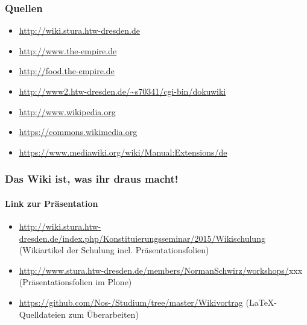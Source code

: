 \documentclass{beamer}              %
\begin{document}
\begin{frame}
  \frametitle{Quellen}
  \begin{itemize}
    \item \url{http://wiki.stura.htw-dresden.de}
    \item \url{http://www.the-empire.de}
    \item \url{http://food.the-empire.de}
    \item \url{http://www2.htw-dresden.de/~s70341/cgi-bin/dokuwiki}
    \item \url{http://www.wikipedia.org}
    \item \url{https://commons.wikimedia.org}
    \item \url{https://www.mediawiki.org/wiki/Manual:Extensions/de}
  \end{itemize}  
\end{frame}

% 
% 
\begin{frame}
  \frametitle{Das Wiki ist, was ihr draus macht!}
  \framesubtitle{Link zur Präsentation}
  \begin{itemize}
    \item \url{http://wiki.stura.htw-dresden.de/index.php/Konstituierungsseminar/2015/Wikischulung} (Wikiartikel der Schulung incl. Präsentationsfolien)
    \item \url{http://www.stura.htw-dresden.de/members/NormanSchwirz/workshops/}xxx (Präsentationsfolien im Plone)
    \item \url{https://github.com/Nos-/Studium/tree/master/Wikivortrag} (LaTeX-Quelldateien zum Überarbeiten)
  \end{itemize}
\end{frame}
\end{document}
